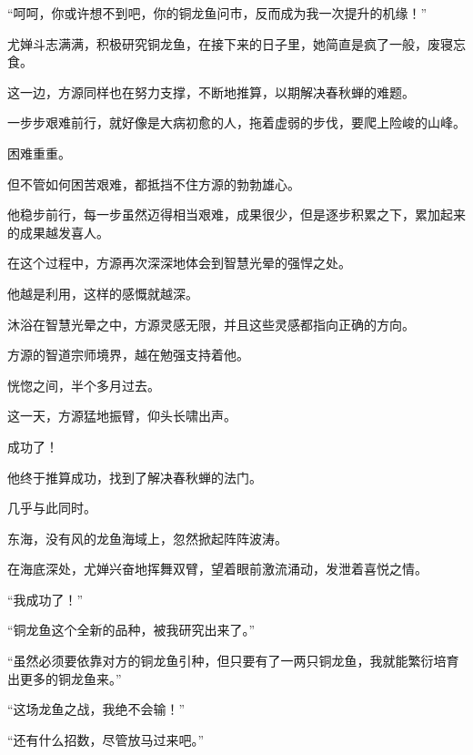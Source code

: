 \begin{this_body}
“呵呵，你或许想不到吧，你的铜龙鱼问市，反而成为我一次提升的机缘！”

尤婵斗志满满，积极研究铜龙鱼，在接下来的日子里，她简直是疯了一般，废寝忘食。

这一边，方源同样也在努力支撑，不断地推算，以期解决春秋蝉的难题。

一步步艰难前行，就好像是大病初愈的人，拖着虚弱的步伐，要爬上险峻的山峰。

困难重重。

但不管如何困苦艰难，都抵挡不住方源的勃勃雄心。

他稳步前行，每一步虽然迈得相当艰难，成果很少，但是逐步积累之下，累加起来的成果越发喜人。

在这个过程中，方源再次深深地体会到智慧光晕的强悍之处。

他越是利用，这样的感慨就越深。

沐浴在智慧光晕之中，方源灵感无限，并且这些灵感都指向正确的方向。

方源的智道宗师境界，越在勉强支持着他。

恍惚之间，半个多月过去。

这一天，方源猛地振臂，仰头长啸出声。

成功了！

他终于推算成功，找到了解决春秋蝉的法门。

几乎与此同时。

东海，没有风的龙鱼海域上，忽然掀起阵阵波涛。

在海底深处，尤婵兴奋地挥舞双臂，望着眼前激流涌动，发泄着喜悦之情。

“我成功了！”

“铜龙鱼这个全新的品种，被我研究出来了。”

“虽然必须要依靠对方的铜龙鱼引种，但只要有了一两只铜龙鱼，我就能繁衍培育出更多的铜龙鱼来。”

“这场龙鱼之战，我绝不会输！”

“还有什么招数，尽管放马过来吧。”

\end{this_body}

